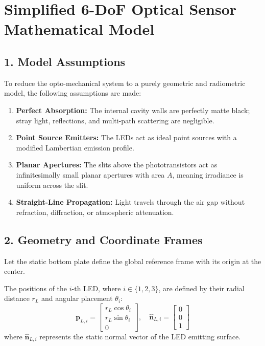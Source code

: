 \documentclass{article}
\begin{document}
\section*{Simplified 6-DoF Optical Sensor Mathematical Model}

\subsection*{1. Model Assumptions}
To reduce the opto-mechanical system to a purely geometric and radiometric model, the following assumptions are made:
\begin{enumerate}
    \item \textbf{Perfect Absorption:} The internal cavity walls are perfectly matte black; stray light, reflections, and multi-path scattering are negligible.
    \item \textbf{Point Source Emitters:} The LEDs act as ideal point sources with a modified Lambertian emission profile.
    \item \textbf{Planar Apertures:} The slits above the phototransistors act as infinitesimally small planar apertures with area $A$, meaning irradiance is uniform across the slit.
    \item \textbf{Straight-Line Propagation:} Light travels through the air gap without refraction, diffraction, or atmospheric attenuation.
\end{enumerate}

\subsection*{2. Geometry and Coordinate Frames}
Let the static bottom plate define the global reference frame with its origin at the center. 

The positions of the $i$-th LED, where $i \in \{1, 2, 3\}$, are defined by their radial distance $r_L$ and angular placement $\theta_i$:
\begin{equation}
    \mathbf{p}_{L,i} = \begin{bmatrix} r_L \cos\theta_i \\ r_L \sin\theta_i \\ 0 \end{bmatrix}, \quad \mathbf{\hat{n}}_{L,i} = \begin{bmatrix} 0 \\ 0 \\ 1 \end{bmatrix}
\end{equation}
where $\mathbf{\hat{n}}_{L,i}$ represents the static normal vector of the LED emitting surface.
\end{document}
